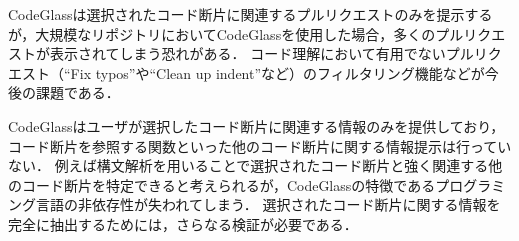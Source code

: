 
CodeGlassは選択されたコード断片に関連するプルリクエストのみを提示するが，大規模なリポジトリにおいてCodeGlassを使用した場合，多くのプルリクエストが表示されてしまう恐れがある．
コード理解において有用でないプルリクエスト（``Fix typos''や``Clean up indent''など）のフィルタリング機能などが今後の課題である．


CodeGlassはユーザが選択したコード断片に関連する情報のみを提供しており，コード断片を参照する関数といった他のコード断片に関する情報提示は行っていない．
例えば構文解析を用いることで選択されたコード断片と強く関連する他のコード断片を特定できると考えられるが，CodeGlassの特徴であるプログラミング言語の非依存性が失われてしまう．
選択されたコード断片に関する情報を完全に抽出するためには，さらなる検証が必要である．